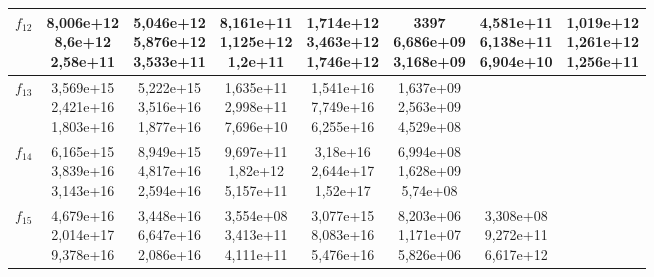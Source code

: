 \begin{table}[t]
\begin{small}
\begin{tabular}{|c|c|c|c|c|c|c|c|}
        $f_{12}$ & \makecell{8,006e+12 \\ 8,6e+12 \\ 2,58e+11}    & \makecell{5,046e+12 \\ 5,876e+12 \\ 3,533e+11} & \makecell{8,161e+11 \\ 1,125e+12 \\ 1,2e+11}   & \makecell{1,714e+12 \\ 3,463e+12 \\ 1,746e+12} & \makecell{\textbf{3397} \\ \textbf{6,686e+09} \\ 3,168e+09}      & \makecell{4,581e+11 \\ 6,138e+11 \\ 6,904e+10} & \makecell{1,019e+12 \\ 1,261e+12 \\ 1,256e+11} \\\hline
        $f_{13}$ & \makecell{3,569e+15 \\ 2,421e+16 \\ 1,803e+16} & \makecell{5,222e+15 \\ 3,516e+16 \\ 1,877e+16} & \makecell{1,635e+11 \\ 2,998e+11 \\ 7,696e+10} & \makecell{1,541e+16 \\ 7,749e+16 \\ 6,255e+16} & \makecell{1,637e+09 \\ 2,563e+09 \\ 4,529e+08} & & \\\hline
        $f_{14}$ & \makecell{6,165e+15 \\ 3,839e+16 \\ 3,143e+16} & \makecell{8,949e+15 \\ 4,817e+16 \\ 2,594e+16} & \makecell{9,697e+11 \\ 1,82e+12 \\ 5,157e+11}  & \makecell{3,18e+16 \\ 2,644e+17 \\ 1,52e+17}  & \makecell{6,994e+08 \\ 1,628e+09 \\ 5,74e+08}  & & \\\hline
        $f_{15}$ & \makecell{4,679e+16 \\ 2,014e+17 \\ 9,378e+16} & \makecell{3,448e+16 \\ 6,647e+16 \\ 2,086e+16} & \makecell{3,554e+08 \\ 3,413e+11 \\ 4,111e+11} & \makecell{3,077e+15 \\ 8,083e+16 \\ 5,476e+16} & \makecell{8,203e+06 \\ 1,171e+07 \\ 5,826e+06} & \makecell{3,308e+08 \\ 9,272e+11 \\ 6,617e+12} & \\\hline

\end{tabular}
\end{small}
\end{table}
